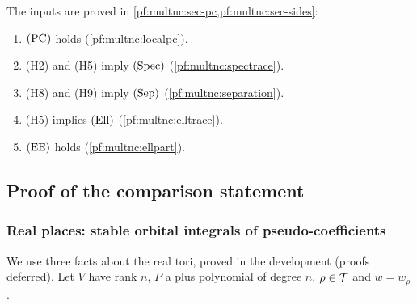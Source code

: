 The inputs are proved in \cref{pf:multnc:sec-pc,pf:multnc:sec-sides}:

\begin{theorem}\label{pf:multnc:inputs}
\begin{enumerate}[label=(\alph*)]
\item $\textup{(PC)}$ holds (\cref{pf:multnc:localpc}).
\item (H2) and (H5) imply $\textup{(Spec)}$ (\cref{pf:multnc:spectrace}).
\item (H8) and (H9) imply $\textup{(Sep)}$ (\cref{pf:multnc:separation}).
\item (H5) implies $\textup{(Ell)}$ (\cref{pf:multnc:elltrace}).
\item $\textup{(EE)}$ holds (\cref{pf:multnc:ellpart}).
\end{enumerate}
\end{theorem}


\subsection{Proof of the comparison statement}\label{pf:multnc:sec-comp}

\subsubsection*{Real places: stable orbital integrals of pseudo-coefficients}

We use three facts about the real tori, proved in the development (proofs deferred). Let $V$ have rank $n$, $P$ a plus
polynomial of degree $n$, $\rho\in\mathcal{T}$ and $w=w_\rho$.

